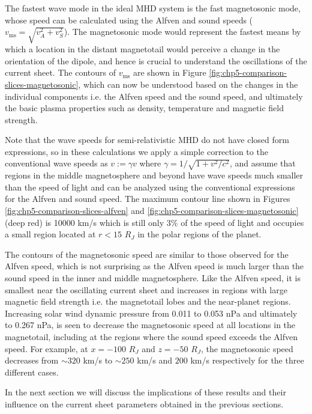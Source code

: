 The fastest wave mode in the ideal MHD system is the fast magnetosonic mode, whose speed can be calculated using the Alfven and sound speeds ($v_\text{ms} = \sqrt{v_A^2 + v_S^2}$). The magnetosonic mode would represent the fastest means by which a location in the distant magnetotail would perceive a change in the orientation of the dipole, and hence is crucial to understand the oscillations of the current sheet. The contours of $v_\text{ms}$ are shown in Figure \ref{fig:chp5-comparison-slices-magnetosonic}, which can now be understood based on the changes in the individual components i.e. the Alfven speed and the sound speed, and ultimately the basic plasma properties such as density, temperature and magnetic field strength. 

Note that the wave speeds for semi-relativistic MHD do not have closed form expressions, so in these calculations we apply a simple correction to the conventional wave speeds as $v := \gamma v$ where $\gamma = 1/\sqrt{1+v^2/c^2}$, and assume that regions in the middle magnetosphere and beyond have wave speeds much smaller than the speed of light and can be analyzed using the conventional expressions for the Alfven and sound speed. The maximum contour line shown in Figures \ref{fig:chp5-comparison-slices-alfven} and \ref{fig:chp5-comparison-slices-magnetosonic} (deep red) is 10000 km/s which is still only 3\% of the speed of light and occupies a small region located at $r < 15$ $R_J$ in the polar regions of the planet. 

The contours of the magnetosonic speed are similar to those observed for the Alfven speed, which is not surprising as the Alfven speed is much larger than the sound speed in the inner and middle magnetosphere. Like the Alfven speed, it is smallest near the oscillating current sheet and increases in regions with large magnetic field strength i.e. the magnetotail lobes and the near-planet regions. Increasing solar wind dynamic pressure from 0.011 to 0.053 nPa and ultimately to 0.267 nPa, is seen to decrease the magnetosonic speed at all locations in the magnetotail, including at the regions where the sound speed exceeds the Alfven speed. For example, at $x=-100$ $R_J$ and $z=-50$ $R_J$, the magnetosonic speed decreases from $\sim320$ km/s to $\sim250$ km/s and $200$ km/s respectively for the three different cases. 

In the next section we will discuss the implications of these results and their influence on the current sheet parameters obtained in the previous sections. 

